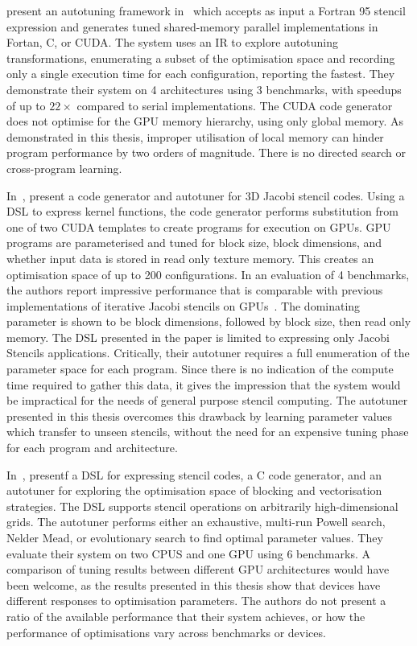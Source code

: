 \documentclass[nonatbib,preprint,10pt]{sigplanconf}
\begin{document}
\citeauthor{Kamil2010} present an autotuning framework
in~\cite{Kamil2010} which accepts as input a Fortran 95 stencil
expression and generates tuned shared-memory parallel implementations
in Fortan, C, or CUDA. The system uses an IR to explore autotuning
transformations, enumerating a subset of the optimisation space and
recording only a single execution time for each configuration,
reporting the fastest. They demonstrate their system on 4
architectures using 3 benchmarks, with speedups of up to $22\times$
compared to serial implementations. The CUDA code generator does not
optimise for the GPU memory hierarchy, using only global memory. As
demonstrated in this thesis, improper utilisation of local memory can
hinder program performance by two orders of magnitude. There is no
directed search or cross-program learning.

In~\cite{Zhang2013a}, \citeauthor{Zhang2013a} present a code generator
and autotuner for 3D Jacobi stencil codes. Using a DSL to express
kernel functions, the code generator performs substitution from one of
two CUDA templates to create programs for execution on GPUs. GPU
programs are parameterised and tuned for block size, block dimensions,
and whether input data is stored in read only texture memory. This
creates an optimisation space of up to 200 configurations. In an
evaluation of 4 benchmarks, the authors report impressive performance
that is comparable with previous implementations of iterative Jacobi
stencils on GPUs~\cite{Holewinski2012, Phillips2010}. The dominating
parameter is shown to be block dimensions, followed by block size,
then read only memory. The DSL presented in the paper is limited to
expressing only Jacobi Stencils applications. Critically, their
autotuner requires a full enumeration of the parameter space for each
program. Since there is no indication of the compute time required to
gather this data, it gives the impression that the system would be
impractical for the needs of general purpose stencil computing. The
autotuner presented in this thesis overcomes this drawback by learning
parameter values which transfer to unseen stencils, without the need
for an expensive tuning phase for each program and architecture.
%

In~\cite{Christen2011}, \citeauthor{Christen2011} presentf a DSL for
expressing stencil codes, a C code generator, and an autotuner for
exploring the optimisation space of blocking and vectorisation
strategies. The DSL supports stencil operations on arbitrarily
high-dimensional grids. The autotuner performs either an exhaustive,
multi-run Powell search, Nelder Mead, or evolutionary search to find
optimal parameter values. They evaluate their system on two CPUS and
one GPU using 6 benchmarks. A comparison of tuning results between
different GPU architectures would have been welcome, as the results
presented in this thesis show that devices have different responses to
optimisation parameters. The authors do not present a ratio of the
available performance that their system achieves, or how the
performance of optimisations vary across benchmarks or devices.
\end{document}
